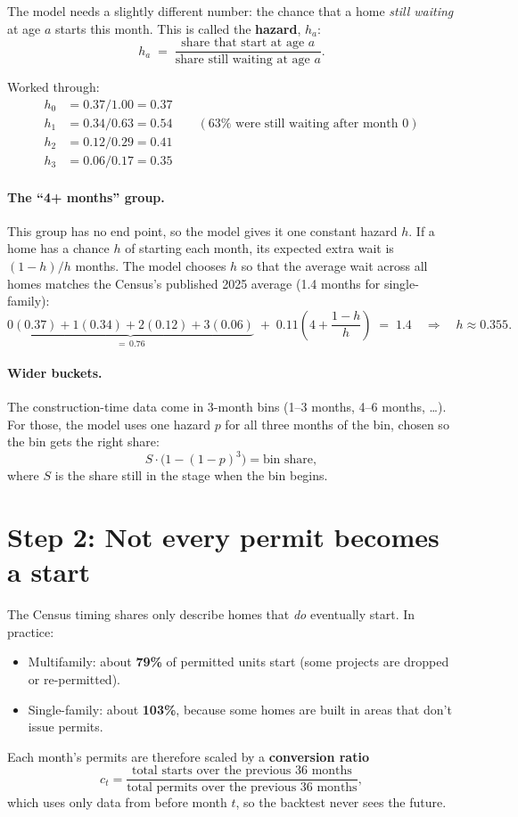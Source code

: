 \documentclass[11pt]{article}
\begin{document}
The model needs a slightly different number: the chance that a home
\emph{still waiting} at age $a$ starts this month. This is called the
\textbf{hazard}, $h_a$:
\[
  h_a \;=\; \frac{\text{share that start at age } a}{\text{share still waiting at age } a}.
\]

Worked through:
\begin{align*}
h_0 &= 0.37 / 1.00 = 0.37 \\
h_1 &= 0.34 / 0.63 = 0.54 \qquad (63\% \text{ were still waiting after month } 0)\\
h_2 &= 0.12 / 0.29 = 0.41 \\
h_3 &= 0.06 / 0.17 = 0.35
\end{align*}

\paragraph{The ``4+ months'' group.} This group has no end point, so the
model gives it one constant hazard $h$. If a home has a chance $h$ of
starting each month, its expected extra wait is $(1-h)/h$ months. The model
chooses $h$ so that the average wait across all homes matches the Census's
published 2025 average (1.4 months for single-family):
\[
  \underbrace{0(0.37) + 1(0.34) + 2(0.12) + 3(0.06)}_{=\,0.76}
  \;+\; 0.11\left(4 + \frac{1-h}{h}\right) \;=\; 1.4
  \quad\Longrightarrow\quad h \approx 0.355 .
\]

\paragraph{Wider buckets.} The construction-time data come in 3-month bins
(1--3 months, 4--6 months, \dots). For those, the model uses one hazard $p$
for all three months of the bin, chosen so the bin gets the right share:
\[
  S \cdot \bigl(1-(1-p)^{3}\bigr) = \text{bin share},
\]
where $S$ is the share still in the stage when the bin begins.

\section{Step 2: Not every permit becomes a start}

The Census timing shares only describe homes that \emph{do} eventually start.
In practice:
\begin{itemize}
  \item Multifamily: about \textbf{79\%} of permitted units start (some projects are
        dropped or re-permitted).
  \item Single-family: about \textbf{103\%}, because some homes are built in areas that
        don't issue permits.
\end{itemize}
Each month's permits are therefore scaled by a \textbf{conversion ratio}
\[
  c_t = \frac{\text{total starts over the previous 36 months}}{\text{total permits over the previous 36 months}},
\]
which uses only data from before month $t$, so the backtest never sees the
future.
\end{document}

